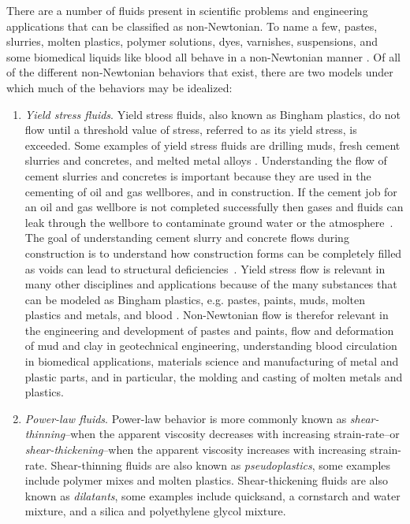 \documentclass{article}
\begin{document}
There are a number of fluids present in scientific problems and engineering applications that can be classified as non-Newtonian.
To name a few, pastes, slurries, molten plastics, polymer solutions, dyes, varnishes, suspensions, and some biomedical liquids like blood all behave in a non-Newtonian manner \cite{bohme1987non}.
Of all of the different non-Newtonian behaviors that exist, there are two models under which much of the behaviors may be idealized:
\begin{enumerate}
	\item \emph{Yield stress fluids}. Yield stress fluids, also known as Bingham plastics, do not flow until a threshold value of stress, referred to as its yield stress, is exceeded.
	Some examples of yield stress fluids are drilling muds, fresh cement slurries and concretes, and melted metal alloys \cite{ginzburg2002free}.
	Understanding the flow of cement slurries and concretes is important because they are used in the cementing of oil and gas wellbores, and in construction.
	If the cement job for an oil and gas wellbore is not completed successfully then gases and fluids can leak through the wellbore to contaminate ground water or the atmosphere~\cite{grasinger2015simulation}.
	The goal of understanding cement slurry and concrete flows during construction is to understand how construction forms can be completely filled as voids can lead to structural deficiencies~\cite{RARR}.
	Yield stress flow is relevant in many other disciplines and applications because of the many substances that can be modeled as Bingham plastics, e.g. pastes, paints, muds, molten plastics and metals, and blood \cite{wang2011lattice}. %
	Non-Newtonian flow is therefor relevant in the engineering and development of pastes and paints, flow and deformation of mud and clay in geotechnical engineering, understanding blood circulation in biomedical applications, materials science and manufacturing of metal and plastic parts, and in particular, the molding and casting of molten metals and plastics.
	
	\item \emph{Power-law fluids}. Power-law behavior is more commonly known as \emph{shear-thinning}--when the apparent viscosity decreases with increasing strain-rate--or \emph{shear-thickening}--when the apparent viscosity increases with increasing strain-rate. Shear-thinning fluids are also known as \emph{pseudoplastics}, some examples include polymer mixes and molten plastics.
	Shear-thickening fluids are also known as \emph{dilatants}, some examples include quicksand, a cornstarch and water mixture, and a silica and polyethylene glycol mixture.
\end{enumerate}
\end{document}
